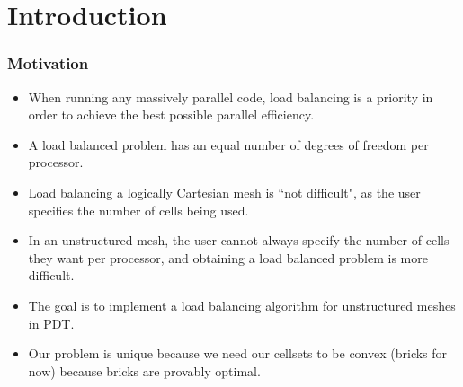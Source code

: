 \documentclass[compress]{beamer}
\begin{document}
\section{Introduction}
\begin{frame}[t]\frametitle{Motivation}
	\begin{block}{}
	\begin{itemize}
		\item When running any massively parallel code, load balancing is a priority in order to achieve the best possible parallel efficiency.
		\item  A load balanced problem has an equal number of degrees of freedom per processor.
		\item Load balancing a logically Cartesian mesh is ``not difficult", as the user specifies the number of cells being used.
		\item In an unstructured mesh, the user cannot always specify the number of cells they want per processor, and obtaining a load balanced problem is more difficult.
		\item The goal is to implement a load balancing algorithm for unstructured meshes in PDT.
		\item Our problem is unique because we need our cellsets to be convex (bricks for now) because bricks are provably optimal.
	\end{itemize}
	\end{block}
\end{frame}
\end{document}

